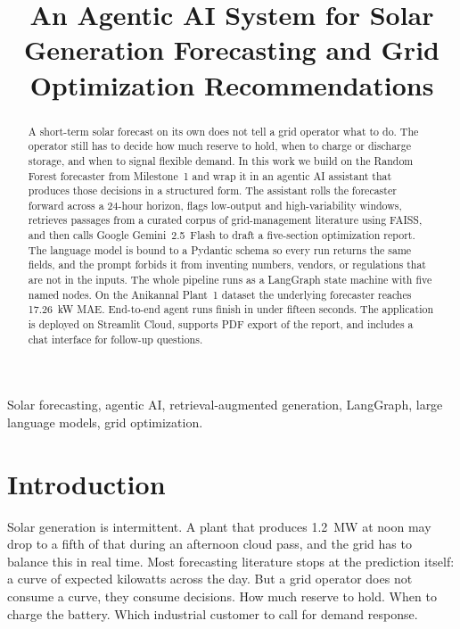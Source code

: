 \documentclass[journal,onecolumn,11pt]{IEEEtran}
\begin{document}
\title{An Agentic AI System for Solar Generation Forecasting and Grid Optimization Recommendations}

\author{
}

\maketitle

\begin{abstract}
A short-term solar forecast on its own does not tell a grid operator what to do. The operator still has to decide how much reserve to hold, when to charge or discharge storage, and when to signal flexible demand. In this work we build on the Random Forest forecaster from Milestone~1 and wrap it in an agentic AI assistant that produces those decisions in a structured form. The assistant rolls the forecaster forward across a 24-hour horizon, flags low-output and high-variability windows, retrieves passages from a curated corpus of grid-management literature using FAISS, and then calls Google Gemini~2.5~Flash to draft a five-section optimization report. The language model is bound to a Pydantic schema so every run returns the same fields, and the prompt forbids it from inventing numbers, vendors, or regulations that are not in the inputs. The whole pipeline runs as a LangGraph state machine with five named nodes. On the Anikannal Plant~1 dataset the underlying forecaster reaches 17.26~kW MAE. End-to-end agent runs finish in under fifteen seconds. The application is deployed on Streamlit Cloud, supports PDF export of the report, and includes a chat interface for follow-up questions.
\end{abstract}

\begin{IEEEkeywords}
Solar forecasting, agentic AI, retrieval-augmented generation, LangGraph, large language models, grid optimization.
\end{IEEEkeywords}

\section{Introduction}

Solar generation is intermittent. A plant that produces 1.2~MW at noon may drop to a fifth of that during an afternoon cloud pass, and the grid has to balance this in real time. Most forecasting literature stops at the prediction itself: a curve of expected kilowatts across the day. But a grid operator does not consume a curve, they consume decisions. How much reserve to hold. When to charge the battery. Which industrial customer to call for demand response.
\end{document}

